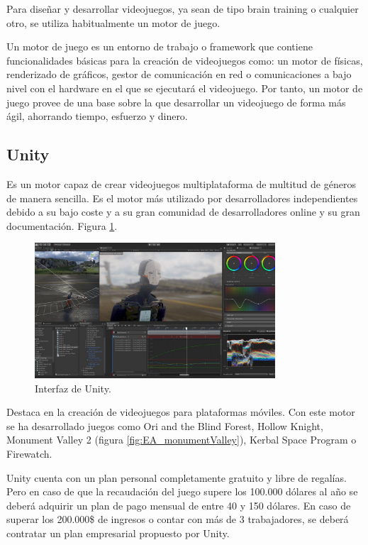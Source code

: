 Para diseñar y desarrollar videojuegos, ya sean de tipo brain training o cualquier otro, se utiliza habitualmente un motor de juego.

Un motor de juego es un entorno de trabajo o framework que contiene funcionalidades básicas para la creación de videojuegos como: un motor de físicas, renderizado de gráficos, gestor de comunicación en red o comunicaciones a bajo nivel con el hardware en el que se ejecutará el videojuego. Por tanto, un motor de juego provee de una base sobre la que desarrollar un videojuego de forma más ágil, ahorrando tiempo, esfuerzo y dinero.

\subsection{Unity}

Es un motor capaz de crear videojuegos multiplataforma de multitud de géneros de manera sencilla. Es el motor más utilizado por desarrolladores independientes debido a su bajo coste y a su gran comunidad de desarrolladores online y su gran documentación. Figura \ref{fig:EA_interfazUnity}.


\begin{figure}[H]
  \centering
\includegraphics[width=0.8\textwidth]{03.EstudioProblema/01.EstadoArte/00.Figuras/26.interfaz_unity.jpg}
    \caption{Interfaz de Unity. \cite{EA_img_interfazUnity}}
    \label{fig:EA_interfazUnity}
\end{figure}


Destaca en la creación de videojuegos para plataformas móviles. Con este motor se ha desarrollado juegos como Ori and the Blind Forest, Hollow Knight, Monument Valley 2 (figura \ref{fig:EA_monumentValley}), Kerbal Space Program o Firewatch.

Unity cuenta con un plan personal completamente gratuito y libre de regalías. Pero en caso de que la recaudación del juego supere los 100.000 dólares al año se deberá adquirir un plan de pago mensual de entre 40 y 150 dólares. En caso de superar los 200.000\$ de ingresos o contar con más de 3 trabajadores, se deberá contratar un plan empresarial propuesto por Unity.





